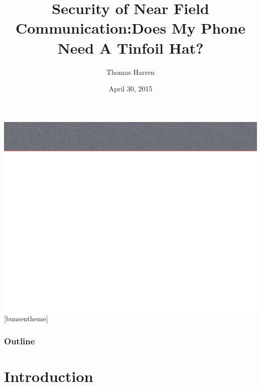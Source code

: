 \documentclass[unknownkeysallowed]{beamer}
\title{Security of Near Field Communication:\break Does My Phone Need A Tinfoil Hat?}
\author{Thomas Harren}
\institute[UMM] %
{
  University of Minnesota, Morris
}
\date[]{April 30, 2015}
\begin{document}
\begin{frame}
  \titlepage
\end{frame}

 {\includegraphics[width=\paperwidth,height=\paperheight]{slide_bg}}
[bunsentheme]


\begin{frame}
  \frametitle{Outline}
\tableofcontents[hideallsubsections]
\end{frame}

\Fontix

\section{Introduction}
\end{document}
